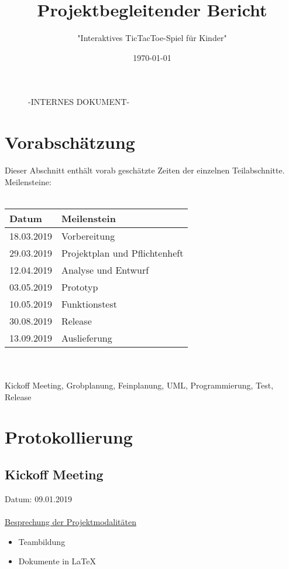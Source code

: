 \documentclass[12pt]{article}
\title{\textbf{Projektbegleitender Bericht}}
\author{"Interaktives TicTacToe-Spiel für Kinder"}
\date{\today} %
\begin{document}
\begin{titlepage}
	\centering	
	\begin{figure}
	\centering
	{\scshape\LARGE -INTERNES DOKUMENT- \par}
	\vspace{1cm}
	\end{figure}
	\maketitle
	\thispagestyle{empty}
	
	\vspace*{10cm}	
	

\end{titlepage}
	
\tableofcontents 
\newpage	

\setcounter{page}{3}

\section{Vorabschätzung}
Dieser Abschnitt enthält vorab geschätzte Zeiten der einzelnen Teilabschnitte.
Meilensteine:\\\\
\begin{tabularx}{\textwidth}{|X|X|} \hline
\textbf{Datum}&\textbf{Meilenstein}\\ \hline
18.03.2019 & Vorbereitung\\ \hline
29.03.2019 & Projektplan und Pflichtenheft\\ \hline
12.04.2019 & Analyse und Entwurf\\ \hline
03.05.2019 & Prototyp\\ \hline
10.05.2019 & Funktionstest\\ \hline
30.08.2019 & Release\\ \hline
13.09.2019 & Auslieferung\\ \hline
\end{tabularx}\\\\

Kickoff Meeting, Grobplanung, Feinplanung, UML, Programmierung,
Test, Release
\newpage

\section{Protokollierung}

\subsection{Kickoff Meeting}
Datum: 09.01.2019 \\ \\
\uline{Besprechung der Projektmodalitäten}
\begin{itemize}\itemsep0em
\item Teambildung
\item Dokumente in LaTeX\\
\end{itemize}
\end{document}
